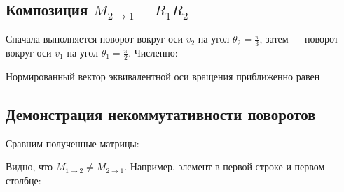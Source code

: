 \documentclass[a4paper,14pt]{extarticle}
\begin{document}
\begin{center}\end{center}

\subsection*{Композиция $M_{2 \to 1} = R_1R_2$}

Сначала выполняется поворот вокруг оси $v_2$ на угол $\theta_2=\frac{\pi}{3}$, затем — поворот вокруг оси $v_1$ на угол $\theta_1=\frac{\pi}{2}$. Численно:

\begin{center}\end{center}

Нормированный вектор эквивалентной оси вращения приближенно равен

\begin{center}\end{center}

\subsection*{Демонстрация некоммутативности поворотов}

Сравним полученные матрицы:

\begin{center}\end{center}

Видно, что $M_{1 \to 2} \neq M_{2 \to 1}$. Например, элемент в первой строке и первом столбце:
\end{document}

